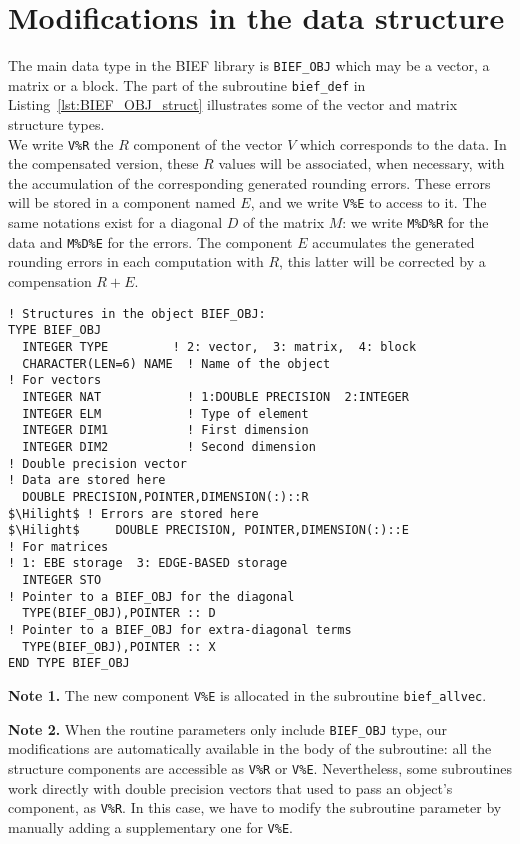 \section{Modifications in the data structure }
\label{sec:imple_data}
%
The main data type in the BIEF library is 
\texttt{BIEF\_OBJ} which may be a vector, a matrix or a block.
The part of the subroutine \texttt{bief\_def} in Listing~\ref{lst:BIEF_OBJ_struct}
illustrates some of the vector and matrix structure types.\\
%
We write \texttt{V\%R} the $R$ component of the vector $V$ 
which corresponds to the data. 
In the compensated version, these $R$ values will be associated,  
when necessary, with the accumulation of the corresponding generated rounding errors.
These errors will be stored in a component named $E$, and
we write \texttt{V\%E} to access to it. 
The same notations exist for a diagonal $D$ of the matrix $M$:
we write \texttt{M\%D\%R} for the data and \texttt{M\%D\%E} for the errors.
The component $E$ accumulates the generated rounding errors in each computation with 
$R$, this latter will be corrected by a compensation $R+E$.
%
\begin{lstlisting}[language=TelFortran,caption={The BIEF\_OBJ structure in \texttt{bief\_def}},label={lst:BIEF_OBJ_struct},escapechar=\$]
! Structures in the object BIEF_OBJ:
TYPE BIEF_OBJ
  INTEGER TYPE         ! 2: vector,  3: matrix,  4: block
  CHARACTER(LEN=6) NAME  ! Name of the object
! For vectors 
  INTEGER NAT            ! 1:DOUBLE PRECISION  2:INTEGER
  INTEGER ELM            ! Type of element
  INTEGER DIM1           ! First dimension
  INTEGER DIM2           ! Second dimension
! Double precision vector
! Data are stored here
  DOUBLE PRECISION,POINTER,DIMENSION(:)::R  
$\Hilight$ ! Errors are stored here     
$\Hilight$     DOUBLE PRECISION, POINTER,DIMENSION(:)::E 
! For matrices
! 1: EBE storage  3: EDGE-BASED storage
  INTEGER STO            
! Pointer to a BIEF_OBJ for the diagonal
  TYPE(BIEF_OBJ),POINTER :: D  
! Pointer to a BIEF_OBJ for extra-diagonal terms
  TYPE(BIEF_OBJ),POINTER :: X  
END TYPE BIEF_OBJ
\end{lstlisting}
%
%
\begin{description}
\item \textbf{Note 1.} The new component \texttt{V\%E} is allocated in the 
subroutine \texttt{bief\_allvec}.
%
\item \textbf{Note 2.} When the routine parameters only include \texttt{BIEF\_OBJ} type,
our modifications are automatically available in the body of the subroutine:
all the structure components are accessible as \texttt{V\%R} or \texttt{V\%E}. 
Nevertheless, some subroutines work directly with double precision vectors that
used to pass an object's component, as \texttt{V\%R}.
In this case, we have to modify the subroutine parameter by manually
adding a supplementary one for \texttt{V\%E}.
\end{description}
%

